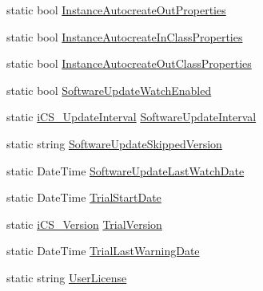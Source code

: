 \begin{DoxyCompactItemize}
\item 
static bool \hyperlink{classi_c_s___preferences_controller_a4496b861761f89fdc6a8647192368ead}{Instance\+Autocreate\+Out\+Properties}
\item 
static bool \hyperlink{classi_c_s___preferences_controller_a27649e0b20eafef778671e75c64ac772}{Instance\+Autocreate\+In\+Class\+Properties}
\item 
static bool \hyperlink{classi_c_s___preferences_controller_a38e6138fc105a6667c133269cd78c3f4}{Instance\+Autocreate\+Out\+Class\+Properties}
\item 
static bool \hyperlink{classi_c_s___preferences_controller_a18a5adbca7edaaa3b741eacf4819780a}{Software\+Update\+Watch\+Enabled}
\item 
static \hyperlink{i_c_s___preferences_controller_8cs_a41e615b0d506572b79d5faf96516a83e}{i\+C\+S\+\_\+\+Update\+Interval} \hyperlink{classi_c_s___preferences_controller_ab2f9e771c581c9a9b1d7b29db52f6233}{Software\+Update\+Interval}
\item 
static string \hyperlink{classi_c_s___preferences_controller_aa01cb8eabda334a56cd86bbbcc2b460a}{Software\+Update\+Skipped\+Version}
\item 
static Date\+Time \hyperlink{classi_c_s___preferences_controller_ac43e723eedfa8d1320236c4a4f4b9166}{Software\+Update\+Last\+Watch\+Date}
\item 
static Date\+Time \hyperlink{classi_c_s___preferences_controller_aa741f8108f91bcc070babe315a75bd06}{Trial\+Start\+Date}
\item 
static \hyperlink{classi_c_s___version}{i\+C\+S\+\_\+\+Version} \hyperlink{classi_c_s___preferences_controller_a8dab83d50ea7ace907036bf981065119}{Trial\+Version}
\item 
static Date\+Time \hyperlink{classi_c_s___preferences_controller_a63a7e31de506cdfa0759eea34783d767}{Trial\+Last\+Warning\+Date}
\item 
static string \hyperlink{classi_c_s___preferences_controller_aae7d9b5f57b639d5670a17361661ea01}{User\+License}
\end{DoxyCompactItemize}


